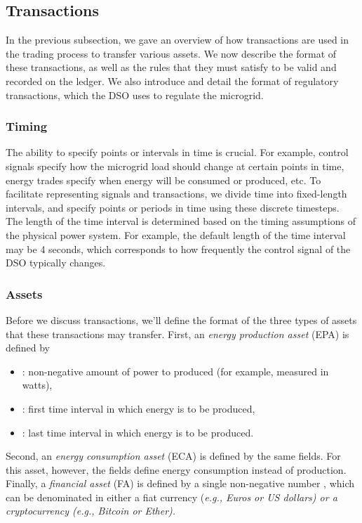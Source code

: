 \subsection{Transactions}

In the previous subsection, we gave an overview of how transactions
are used in the trading process to transfer various assets.  We now
describe the format of these transactions, as well as the rules that
they must satisfy to be valid and recorded on the ledger.  We also
introduce and detail the format of regulatory transactions, which the
DSO uses to regulate the microgrid.

\subsubsection{Timing}

The ability to specify points or intervals in time is crucial.  For
example, control signals specify how the microgrid load should change
at certain points in time, energy trades specify when energy will be
consumed or produced, etc.  To facilitate representing signals and
transactions, we divide time into fixed-length intervals, and specify
points or periods in time using these discrete timesteps.  The length
of the time interval is determined based on the timing assumptions of
the physical power system.  For example, the default length of the
time interval may be 4 seconds, which corresponds to how frequently
the control signal of the DSO typically changes.      

\subsubsection{Assets}
Before we discuss transactions, we'll define the format of the three
types of assets that these transactions may transfer.  First, an
\emph{energy production asset} (EPA) is defined by
\begin{itemize}[noitemsep,topsep=-\parskip]
\item {}: non-negative amount of power to produced (for example, measured in watts),
\item {}: first time interval in which energy is to be produced,
\item {}: last time interval in which energy is to be produced.
\end{itemize}
\vspace{\parskip} Second, an \emph{energy consumption asset} (ECA) is
defined by the same fields.  For this asset, however, the fields
define energy consumption instead of production.  Finally, a
\emph{financial asset} (FA) is defined by a single non-negative number
, which can be denominated in either a fiat currency
(\em{e.g.}, Euros or US dollars) or a cryptocurrency (\em{e.g.},
Bitcoin or Ether).

